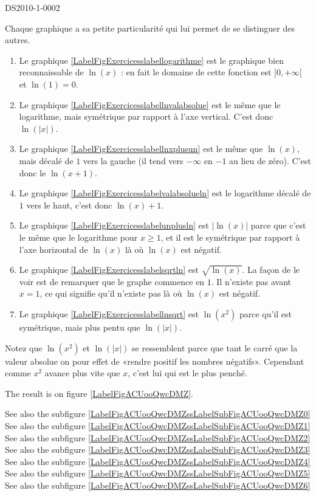 
\begin{corrige}{DS2010-1-0002}

	Chaque graphique a sa petite particularité qui lui permet de se distinguer des autres.
	\begin{enumerate}
		\item
			Le graphique \ref{LabelFigExercicesslabellogarithme} est le graphique bien reconnaissable de $\ln(x)$ : en fait le domaine de cette fonction est $]0, +\infty[$ et $\ln (1)=0$.
		\item
			Le graphique \ref{LabelFigExercicesslabellnvalabsolue} est le même que le logarithme, mais symétrique par rapport à l'axe vertical. C'est donc $\ln(| x |)$.
		\item
			Le graphique \ref{LabelFigExercicesslabellnxplusun} est le même que $\ln(x)$, mais décalé de $1$ vers la gauche (il tend vers $-\infty$ en $-1$ au lieu de zéro). C'est donc le $\ln(x+1)$.
		\item
			Le graphique \ref{LabelFigExercicesslabelvalabsolueln} est le logarithme décalé de $1$ vers le haut, c'est donc $\ln(x)+1$.
		\item
			Le graphique \ref{LabelFigExercicesslabelunplusln} est $| \ln(x) |$ parce que c'est le même que le logarithme pour $x\geq 1$, et il est le symétrique par rapport à l'axe horizontal de $\ln(x)$ là où $\ln(x)$ est négatif.
		\item
			Le graphique \ref{LabelFigExercicesslabelsqrtln} est $\sqrt{\ln(x)}$. La façon de le voir est de remarquer que le graphe commence en $1$. Il n'existe pas avant $x=1$, ce qui signifie qu'il n'existe pas là où $\ln(x)$ est négatif.
		\item
			Le graphique \ref{LabelFigExercicesslabellnsqrt} est $\ln(x^2)$ parce qu'il est symétrique, mais plus pentu que $\ln(| x |)$.
			
	\end{enumerate}
	Notez que $\ln(x^2)$ et $\ln(| x |)$ se ressemblent parce que tant le carré que la valeur absolue on pour effet de «rendre positif les nombres négatifs». Cependant comme $x^2$ avance plus vite que $x$, c'est lui qui est le plus penché.

\end{corrige}


The result is on figure \ref{LabelFigACUooQwcDMZ}. %
\newcommand{\CaptionFigACUooQwcDMZ}{<+Type your caption here+>}

See also the subfigure \ref{LabelFigACUooQwcDMZssLabelSubFigACUooQwcDMZ0}
See also the subfigure \ref{LabelFigACUooQwcDMZssLabelSubFigACUooQwcDMZ1}
See also the subfigure \ref{LabelFigACUooQwcDMZssLabelSubFigACUooQwcDMZ2}
See also the subfigure \ref{LabelFigACUooQwcDMZssLabelSubFigACUooQwcDMZ3}
See also the subfigure \ref{LabelFigACUooQwcDMZssLabelSubFigACUooQwcDMZ4}
See also the subfigure \ref{LabelFigACUooQwcDMZssLabelSubFigACUooQwcDMZ5}
See also the subfigure \ref{LabelFigACUooQwcDMZssLabelSubFigACUooQwcDMZ6}

